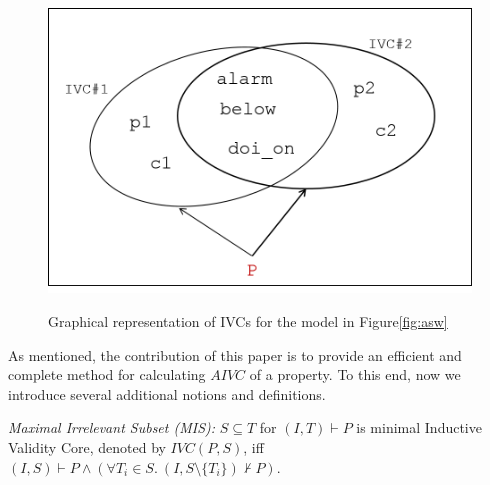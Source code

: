 \begin{figure}[t]
 \centering
  \includegraphics[width=0.9\columnwidth]{figs/ivcs.png}
  \label{fig:ivcs}
  \vspace{-0.1in}
  \caption{Graphical representation of IVCs for the model in Figure\ref{fig:asw}}
\end{figure}

As mentioned, the contribution of this paper is to provide an efficient and complete method for calculating $AIVC$ of a property. To this end, now we introduce several additional notions and definitions.  

\begin{definition}{\emph{Maximal Irrelevant Subset (MIS):}}
  \label{def:mis}
  $S \subseteq T$ for $(I, T)\vdash P$ is minimal Inductive Validity Core,
  denoted by $IVC(P, S)$, iff
  $(I, S) \vdash P \wedge (\forall T_i \in S.~ (I, S\setminus\{ T_i \}) \nvdash P) $.
\end{definition}

%


